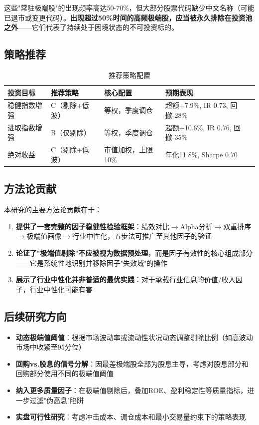 \documentclass[10pt,a4paper]{ctexart}
\begin{document}
这些"常驻极端股"的出现频率高达50-70\%，但大部分股票代码缺少中文名称（可能已退市或变更代码）。\textbf{出现超过50\%时间的高频极端股，应当被永久排除在投资池之外}——它们代表了持续处于困境状态的不可投资标的。

\subsection{策略推荐}

\begin{table}[htbp]
\centering
\caption{推荐策略配置}
\begin{tabular}{lp{2.5cm}p{2.5cm}p{2.5cm}}
\toprule
\textbf{投资目标} & \textbf{推荐策略} & \textbf{核心配置} & \textbf{预期表现} \\
\midrule
稳健指数增强 & C（剔除+低波） & 等权，季度调仓 & 超额+7.9\%, IR 0.73, 回撤-28\% \\
进取指数增强 & B（仅剔除） & 等权，季度调仓 & 超额+10.6\%, IR 0.76, 回撤-35\% \\
绝对收益 & C（剔除+低波） & 市值加权，上限10\% & 年化11.8\%, Sharpe 0.70 \\
\bottomrule
\end{tabular}
\end{table}

\subsection{方法论贡献}

本研究的主要方法论贡献在于：
\begin{enumerate}[label=(\arabic*)]
    \item \textbf{提供了一套完整的因子稳健性检验框架}：绩效对比$\rightarrow$Alpha分析$\rightarrow$双重排序$\rightarrow$极端值画像$\rightarrow$行业中性化，五步法可推广至其他因子的验证
    \item \textbf{论证了"极端值剔除"不应被视为数据预处理}，而是因子有效性的核心组成部分——它是系统性地识别并移除因子"失效域"的操作
    \item \textbf{展示了行业中性化并非普适的最优实践}：对于承载行业信息的价值/收入因子，行业中性化可能有害
\end{enumerate}

\subsection{后续研究方向}

\begin{itemize}
    \item \textbf{动态极端值阈值}：根据市场波动率或流动性状况动态调整剔除比例（如高波动市场中收紧至95分位）
    \item \textbf{回购vs.股息的信号分解}：因最差极端股全部为股息主导，考虑对股息部分和回购部分使用不同的极端值阈值
    \item \textbf{纳入更多质量因子}：在极端值剔除后，叠加ROE、盈利稳定性等质量指标，进一步过滤"伪高息"陷阱
    \item \textbf{实盘可行性研究}：考虑冲击成本、调仓成本和最小交易量约束下的策略表现
\end{itemize}
\end{document}
